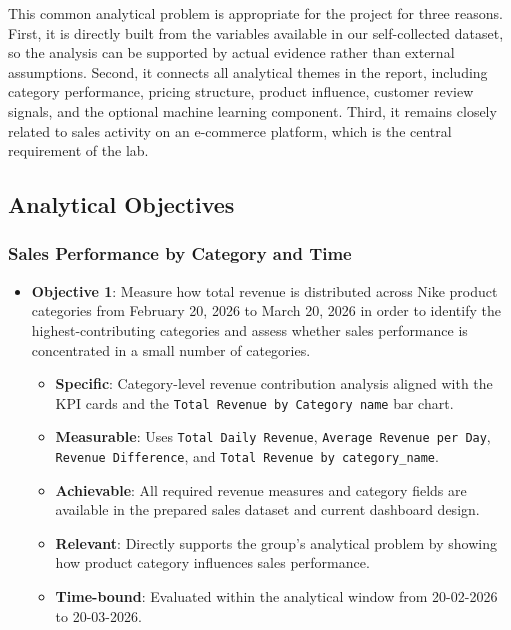 This common analytical problem is appropriate for the project for three reasons. First, it is directly built from the variables available in our self-collected dataset, so the analysis can be supported by actual evidence rather than external assumptions. Second, it connects all analytical themes in the report, including category performance, pricing structure, product influence, customer review signals, and the optional machine learning component. Third, it remains closely related to sales activity on an e-commerce platform, which is the central requirement of the lab.

\subsection{Analytical Objectives}
    \subsubsection{Sales Performance by Category and Time}
    \begin{itemize}
        \item \textbf{Objective 1}: Measure how total revenue is distributed across Nike product categories from February 20, 2026 to March 20, 2026 in order to identify the highest-contributing categories and assess whether sales performance is concentrated in a small number of categories.
        \begin{itemize}
            \item \textbf{Specific}: Category-level revenue contribution analysis aligned with the KPI cards and the \texttt{Total Revenue by Category name} bar chart.
            \item \textbf{Measurable}: Uses \texttt{Total Daily Revenue}, \texttt{Average Revenue per Day}, \texttt{Revenue Difference}, and \texttt{Total Revenue by category\_name}.
            \item \textbf{Achievable}: All required revenue measures and category fields are available in the prepared sales dataset and current dashboard design.
            \item \textbf{Relevant}: Directly supports the group's analytical problem by showing how product category influences sales performance.
            \item \textbf{Time-bound}: Evaluated within the analytical window from 20-02-2026 to 20-03-2026.
        \end{itemize}
    \end{itemize}

